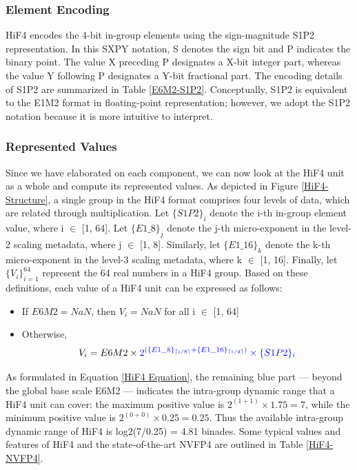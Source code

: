 

\subsubsection{Element Encoding}

HiF4 encodes the 4-bit in-group elements using the 
sign-magnitude S1P2 representation. 
In this SXPY notation, S denotes the sign bit and P indicates the 
binary point. 
The value X preceding P designates a X-bit integer part, whereas 
the value Y following P designates a Y-bit fractional part. 
The encoding details of S1P2 are summarized in Table \ref{E6M2-S1P2}. 
Conceptually, S1P2 is equivalent to the E1M2 format in floating-point 
representation; 
however, we adopt the S1P2 notation because it is more intuitive to 
interpret.

\subsubsection{Represented Values}

Since we have elaborated on each component, 
we can now look at the HiF4 unit as a whole and 
compute its represented values. 
As depicted in Figure \ref{HiF4-Structure}, 
a single group in the HiF4 format comprises four 
levels of data, 
which are related through multiplication. 
Let $\{S1P2\}_i$ denote the i-th in-group element 
value, where i $\in$ [1, 64].
Let $\{E1\_8\}_j$ denote the j-th micro-exponent in the 
level-2 scaling metadata, where j $\in$ [1, 8]. 
Similarly, let $\{E1\_16\}_k$ denote the k-th 
micro-exponent in the level-3 scaling metadata, 
where k $\in$ [1, 16]. 
Finally, let $\{V_i\}_{i=1}^{64}$ represent the 64 real 
numbers in a HiF4 group. 
Based on these definitions, each value of a HiF4 unit 
can be expressed as follows: 
\begin{itemize}
  \item If $E6M2 = NaN$, then $V_i = NaN$ for all i $\in$ [1, 64] 
  \item Otherwise, 
  \begin{equation}
    V_i = E6M2 \times {\color{blue} 2^{(\{E1\_8\}_{\lceil i/8 \rceil} + 
      \{E1\_16\}_{\lceil i/4 \rceil})} \times \{S1P2\}_i} 
      \label{HiF4 Equation}
  \end{equation}
\end{itemize}
  
As formulated in Equation \ref{HiF4 Equation}, 
the remaining blue part — beyond the global base scale E6M2 — 
indicates the intra-group dynamic range that a HiF4 unit can 
cover: 
the maximum positive value is $2^{(1+1)} \times 1.75 = 7$, 
while the minimum positive value is $2^{(0+0)} \times 0.25 = 0.25$. 
Thus the available intra-group dynamic range of HiF4 is 
log2(7/0.25) = 4.81 binades. 
Some typical values and features of HiF4 and the state-of-the-art 
NVFP4 \cite{Abecassis2025} are outlined in Table \ref{HiF4-NVFP4}. 


